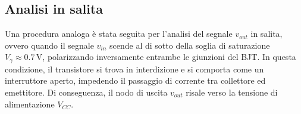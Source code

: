 \documentclass[a4paper,12pt]{article}
\begin{document}

\subsection{Analisi in salita}
Una procedura analoga è stata seguita per l'analisi del segnale \(v_{out}\) in salita, ovvero quando il segnale \(v_{in}\) scende al di sotto della soglia di saturazione \(V_\gamma \approx 0.7\,\mathrm{V}\), polarizzando inversamente entrambe le giunzioni del BJT. In questa condizione, il transistore si trova in interdizione e si comporta come un interruttore aperto, impedendo il passaggio di corrente tra collettore ed emettitore. Di conseguenza, il nodo di uscita \(v_{out}\) risale verso la tensione di alimentazione \(V_{CC}\).
\end{document}
